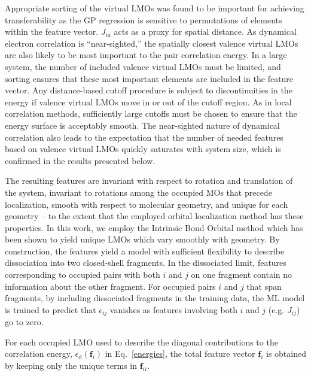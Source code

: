 \documentclass[%
 aps,
 prb,
 twocolumn,
%
 reprint,%
%
citeautoscript,
%
showkeys
]{revtex4-1}
\begin{document}
Appropriate sorting of the virtual LMOs was found to be important for achieving transferability as the GP regression is sensitive to permutations of elements within the feature vector. 
$J_{ia}$ acts as a proxy for spatial distance.
%
As dynamical electron correlation is ``near-sighted,''\cite{Boughton1993} the spatially closest valence virtual LMOs are also likely to be most important to the pair correlation energy. 
In a large system, the number of included valence virtual LMOs must be limited, %
and sorting ensures that these most important elements are included in the feature vector. 
Any distance-based cutoff procedure is subject to discontinuities in the energy if valence virtual LMOs move in or out of the cutoff region. As in local correlation methods, sufficiently large cutoffs must be chosen to ensure that the energy surface is acceptably smooth.\cite{Russ2004} The near-sighted nature of dynamical correlation also leads to the expectation that the number of needed features based on valence virtual LMOs quickly saturates with system size, which is confirmed in the results presented below. 

%
The resulting features are invariant with respect to rotation and translation of the system, invariant to rotations among the occupied MOs that precede localization, smooth with respect to molecular geometry, and unique for each geometry -- to the extent that the employed orbital localization method has these properties.
In this work, we employ the Intrinsic Bond Orbital method which has been shown to yield unique LMOs which vary smoothly with geometry.\cite{Knizia2013IBO,Knizia2015} 
By construction, the features yield a model with sufficient flexibility to describe dissociation into two closed-shell fragments. 
In the dissociated limit, features corresponding to occupied pairs with both $i$ and $j$ on one fragment contain no information about the other fragment. 
For occupied pairs $i$ and $j$ that span fragments, 
by including dissociated fragments in the training data,
the ML model is trained to predict that 
$\epsilon_{ij}$ vanishes as features involving both $i$ and $j$ (e.g. $J_{ij}$) go to zero.

For each occupied LMO used to describe the diagonal contributions to the correlation energy, $\epsilon_{\textrm{d}}(\mathbf{f}_{i})$ in Eq.~\ref{energies}, the total feature vector $\mathbf{f}_{i}$ is obtained by keeping only the unique  terms in $\mathbf{f}_{ii}$.
%


%
%
%
%
%
%
%
%

%
\end{document}

